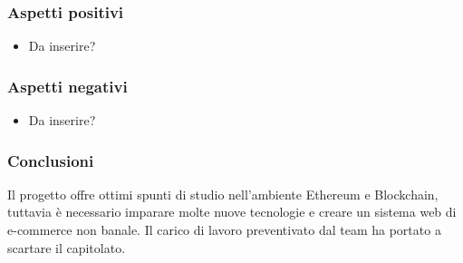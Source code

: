 		\subsubsection{Aspetti positivi}
		\begin{itemize}
			\item Da inserire?
		\end{itemize}
		\subsubsection{Aspetti negativi}
		\begin{itemize}
			\item Da inserire?
		\end{itemize}
		\subsubsection{Conclusioni}
		Il progetto offre ottimi spunti di studio nell’ambiente Ethereum e Blockchain, tuttavia è necessario imparare molte nuove tecnologie e creare un sistema web di e-commerce non banale. Il carico di lavoro preventivato dal team ha portato a scartare il capitolato.